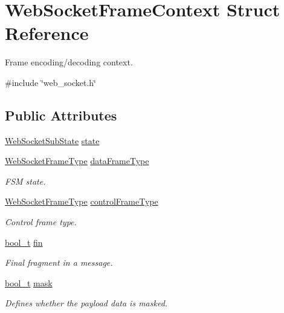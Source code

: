 \hypertarget{structWebSocketFrameContext}{}\section{Web\+Socket\+Frame\+Context Struct Reference}
\label{structWebSocketFrameContext}


Frame encoding/decoding context.  




{\ttfamily \#include \char`\"{}web\+\_\+socket.\+h\char`\"{}}

\subsection*{Public Attributes}
\begin{DoxyCompactItemize}
\item 
\hyperlink{web__socket_8h_add467139cdc2100a7640faa4fb6c36d7}{Web\+Socket\+Sub\+State} \hyperlink{structWebSocketFrameContext_ab89eea5d9b9f9a20fd7675db64016dc0}{state}
\item 
\hyperlink{web__socket_8h_a5cb4405f3460a36460b6ba588b60ea28}{Web\+Socket\+Frame\+Type} \hyperlink{structWebSocketFrameContext_a036fe6609ab0425c8e56724c22e8760b}{data\+Frame\+Type}
\begin{DoxyCompactList}\small\item\em F\+SM state. \end{DoxyCompactList}\item 
\hyperlink{web__socket_8h_a5cb4405f3460a36460b6ba588b60ea28}{Web\+Socket\+Frame\+Type} \hyperlink{structWebSocketFrameContext_a7bb7a8727546244769ec56b41f991fee}{control\+Frame\+Type}
\begin{DoxyCompactList}\small\item\em Control frame type. \end{DoxyCompactList}\item 
\hyperlink{compiler__port_8h_a812d16e5494522586b3784e55d479912}{bool\+\_\+t} \hyperlink{structWebSocketFrameContext_a0ac654d7668a4269ca136460a5361b50}{fin}
\begin{DoxyCompactList}\small\item\em Final fragment in a message. \end{DoxyCompactList}\item 
\hyperlink{compiler__port_8h_a812d16e5494522586b3784e55d479912}{bool\+\_\+t} \hyperlink{structWebSocketFrameContext_a98aeed86b6916fbcf5aa32f7439066e0}{mask}
\begin{DoxyCompactList}\small\item\em Defines whether the payload data is masked. \end{DoxyCompactList}\item 

\end{DoxyCompactItemize}
